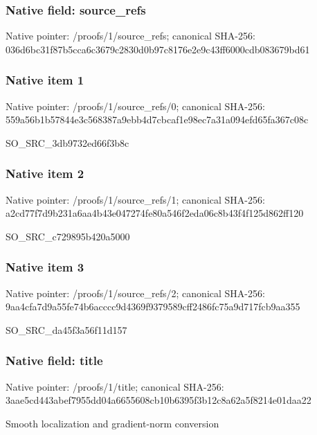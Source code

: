 \documentclass[10pt,a4paper]{article}
\begin{document}
\subsubsection{Native field: source\_\allowbreak{}refs}
Native pointer: /proofs/1/source\_\allowbreak{}refs; canonical SHA-256: 036d6bc31f87b5cca6c3679c2830d0b97c8176e2e9c43ff6000cdb083679bd61

\subsubsection{Native item 1}
Native pointer: /proofs/1/source\_\allowbreak{}refs/0; canonical SHA-256: 559a56b1b57844e3c568387a9ebb4d7cbcaf1e98ec7a31a094efd65fa367c08c

\begingroup\raggedright\sloppy SO\_\allowbreak{}SRC\_\allowbreak{}3db9732ed66f3b8c\par\endgroup

\subsubsection{Native item 2}
Native pointer: /proofs/1/source\_\allowbreak{}refs/1; canonical SHA-256: a2cd77f7d9b231a6aa4b43e047274fe80a546f2eda06c8b43f4f125d862ff120

\begingroup\raggedright\sloppy SO\_\allowbreak{}SRC\_\allowbreak{}c729895b420a5000\par\endgroup

\subsubsection{Native item 3}
Native pointer: /proofs/1/source\_\allowbreak{}refs/2; canonical SHA-256: 9aa4cfa7d9a55fe74b6acccc9d4369f9379589cff2486fc75a9d717fcb9aa355

\begingroup\raggedright\sloppy SO\_\allowbreak{}SRC\_\allowbreak{}da45f3a56f11d157\par\endgroup

\subsubsection{Native field: title}
Native pointer: /proofs/1/title; canonical SHA-256: 3aae5cd443abef7955dd04a6655608cb10b6395f3b12c8a62a5f8214e01daa22

\begingroup\raggedright\sloppy Smooth localization and gradient-norm conversion\par\endgroup
\end{document}
